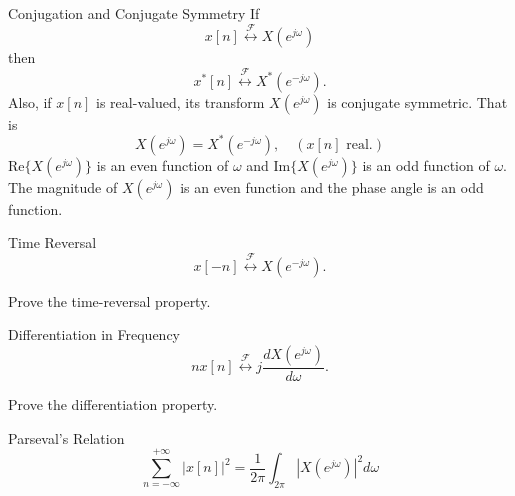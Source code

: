 \begin{frame}{Conjugation and Conjugate Symmetry}
    If
    \begin{equation*}
        x[n] \overset{\mathcal{F}}{\leftrightarrow} X(e^{j\omega})
    \end{equation*}
    then
    \begin{equation*}
        x^\ast[n] \overset{\mathcal{F}}{\leftrightarrow} X^\ast(e^{-j\omega}).
    \end{equation*}
    Also, if $x[n]$ is real-valued, its transform $X(e^{j\omega})$ is conjugate symmetric. That is
    \begin{equation*}
        X(e^{j\omega}) = X^\ast(e^{-j\omega}), \quad (x[n] \text{ real}.)
    \end{equation*}
    $\mathrm{Re}\{X(e^{j\omega})\}$ is an even function of $\omega$ and  $\mathrm{Im}\{X(e^{j\omega})\}$ is an odd function of $\omega$.\\
    The magnitude of $X(e^{j\omega})$ is an even function and the phase angle is an odd function.
\end{frame}

\begin{frame}{Time Reversal}
    \begin{equation*}
        x[-n] \overset{\mathcal{F}}{\leftrightarrow} X(e^{-j\omega}).
    \end{equation*}
    \begin{example}
        Prove the time-reversal property.
    \end{example}
\end{frame}

\begin{frame}{Differentiation in Frequency}
    \begin{equation*}
        nx[n] \overset{\mathcal{F}}{\leftrightarrow} j \frac{d X(e^{j\omega})}{d\omega}.
    \end{equation*}
    \begin{example}
        Prove the differentiation property.
    \end{example}
\end{frame}

\begin{frame}{Parseval's Relation}
    \begin{equation*}
        \sum_{n=-\infty}^{+\infty}|x[n]|^2 = \frac{1}{2\pi}\int_{2\pi} | X(e^{j\omega})|^2d\omega
    \end{equation*}
\end{frame}

